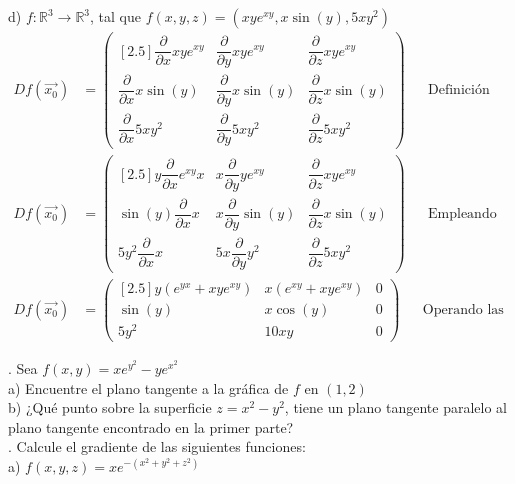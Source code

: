 \documentclass[letterpaper]{article}
\renewcommand{\d}{\partial}
\renewcommand{\*}{\cdot}
\theoremstyle{definition}
\begin{document}
\noindent d) $f: \mathbb{R}^3  \longrightarrow \mathbb{R}^3$, tal que $f(x,y,z) = (xye^{xy}, x\sin(y), 5xy^2)$
\begin{align*}
	Df(\vec{x_0}) &= \begin{pmatrix}[2.5]
	\dfrac{\d }{\d x} xye^{xy}  & \dfrac{\d }{\d y} xye^{xy}  & \dfrac{\d }{\d z} xye^{xy} \\
	\dfrac{\d }{\d x} x\sin(y) & \dfrac{\d }{\d y} x\sin(y) & \dfrac{\d }{\d z} x\sin(y) \\
	\dfrac{\d }{\d x}  5xy^2 & \dfrac{\d }{\d y}  5xy^2 & \dfrac{\d }{\d z}  5xy^2 
	\end{pmatrix} && \text{Definición de matriz de derivadas parciales}\\
	Df(\vec{x_0}) &= \begin{pmatrix}[2.5]
	y\dfrac{\d }{\d x} e^{xy}x  & x\dfrac{\d }{\d y} ye^{xy}  & \dfrac{\d }{\d z} xye^{xy} \\
	\sin(y)\dfrac{\d }{\d x} x & x\dfrac{\d }{\d y} \sin(y) & \dfrac{\d }{\d z} x\sin(y) \\
	5y^2\dfrac{\d }{\d x}  x & 5x\dfrac{\d }{\d y}  y^2 & \dfrac{\d }{\d z}  5xy^2 
	\end{pmatrix} && \text{Empleando que la derivada es operador lineal}
\end{align*}
\begin{align*}
	Df(\vec{x_0}) &= \begin{pmatrix}[2.5]
	y(e^{yx} + xye^{xy})  & x(e^{xy} + xye^{xy})  & 0 \\
	\sin(y) & x\cos(y) & 0 \\
	5y^2 & 10xy & 0 
	\end{pmatrix} && \text{Operando las dervidas parciales}
\end{align*}

.  Sea $f(x,y) = xe^{y^2} - ye^{x^2}$\\


\noindent a) Encuentre el plano tangente a la gráfica de $f$ en $(1, 2)$\\

\noindent b) ¿Qué punto sobre la superficie $z = x^2 -y^2$, tiene un plano tangente paralelo al plano tangente encontrado en la primer parte?\\


.  Calcule el gradiente de las siguientes funciones:\\


\noindent a) $f(x,y,z) = x e^{-(x^2 +y^2 +z^2)}$\\
\end{document}
